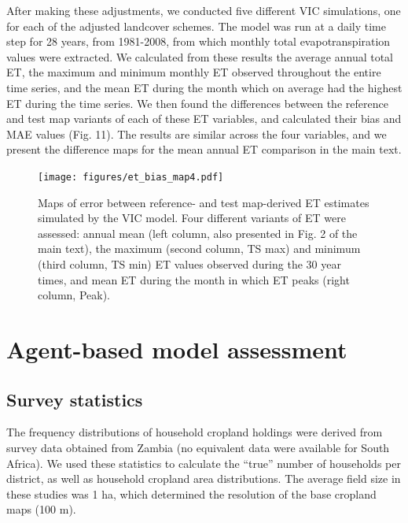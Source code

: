 \documentclass[11pt, titlepage]{article}
\begin{document}
After making these adjustments, we conducted five different VIC simulations, one for each of the adjusted landcover schemes. The model was run at a daily time step for 28 years, from 1981-2008, from which monthly total evapotranspiration values were extracted.  We calculated from these results the average annual total ET, the maximum and minimum monthly ET observed throughout the entire time series, and the mean ET during the month which on average had the highest ET during the time series. We then found the differences between the reference and test map variants of each of these ET variables, and calculated their bias and MAE values (Fig. 11). The results are similar across the four variables, and we present the difference maps for the mean annual ET comparison in the main text.  

\begin{figure}[ht]
  \centering
     \texttt{[image: figures/et\_bias\_map4.pdf]} 
      \caption{Maps of error between reference- and test map-derived ET estimates simulated by the VIC model. Four different variants of ET were assessed: annual mean (left column, also presented in Fig. 2 of the main text), the maximum (second column, TS max) and minimum (third column, TS min) ET values observed during the 30 year times, and mean ET during the month in which ET peaks (right column, Peak).}
      \label{fig:default}
\end{figure}


\section{\large Agent-based model assessment}

\subsection{\large Survey statistics}
The frequency distributions of household cropland holdings were derived from survey data obtained from Zambia (no equivalent data were available for South Africa). We used these statistics to calculate the ``true'' number of households per district, as well as household cropland area distributions. The average field size in these studies was 1 ha, which determined the resolution of the base cropland maps (100 m). 
\end{document}
